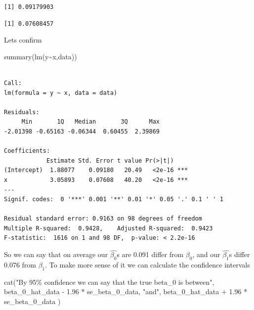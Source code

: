 \documentclass[
  letterpaper,
  DIV=11,
  numbers=noendperiod]{scrreprt}
\newenvironment{Shaded}{\begin{snugshade}}{\end{snugshade}}
\newcommand{\DecValTok}[1]{\textcolor[rgb]{0.47,0.16,0.63}{#1}}
\newcommand{\FloatTok}[1]{\textcolor[rgb]{0.65,0.35,0.00}{#1}}
\newcommand{\FunctionTok}[1]{\textcolor[rgb]{0.02,0.16,0.49}{#1}}
\newcommand{\NormalTok}[1]{\textcolor[rgb]{0.33,0.33,0.33}{#1}}
\newcommand{\OtherTok}[1]{\textcolor[rgb]{0.85,0.12,0.09}{#1}}
\newcommand{\SpecialCharTok}[1]{\textcolor[rgb]{0.00,0.46,0.62}{#1}}
\newcommand{\StringTok}[1]{\textcolor[rgb]{0.00,0.50,0.00}{#1}}
\begin{document}
\begin{verbatim}
[1] 0.09179903
\end{verbatim}

\begin{Shaded}
\end{Shaded}

\begin{verbatim}
[1] 0.07608457
\end{verbatim}

Lets confirm

\begin{Shaded}
\begin{Highlighting}[]
\FunctionTok{summary}\NormalTok{(}\FunctionTok{lm}\NormalTok{(y}\SpecialCharTok{\textasciitilde{}}\NormalTok{x,data))}
\end{Highlighting}
\end{Shaded}

\begin{verbatim}

Call:
lm(formula = y ~ x, data = data)

Residuals:
     Min       1Q   Median       3Q      Max 
-2.01398 -0.65163 -0.06344  0.60455  2.39869 

Coefficients:
            Estimate Std. Error t value Pr(>|t|)    
(Intercept)  1.88077    0.09180   20.49   <2e-16 ***
x            3.05893    0.07608   40.20   <2e-16 ***
---
Signif. codes:  0 '***' 0.001 '**' 0.01 '*' 0.05 '.' 0.1 ' ' 1

Residual standard error: 0.9163 on 98 degrees of freedom
Multiple R-squared:  0.9428,    Adjusted R-squared:  0.9423 
F-statistic:  1616 on 1 and 98 DF,  p-value: < 2.2e-16
\end{verbatim}

So we can say that on average our \(\hat{\beta_0}\)s are 0.091 differ
from \(\beta_0\), and our \(\hat{\beta_1}\)s differ 0.076 from
\(\beta_1\). To make more sense of it we can calculate the confidence
intervals

\begin{Shaded}
\begin{Highlighting}[]
\FunctionTok{cat}\NormalTok{(}\StringTok{"By 95\% confidence we can say that the true beta\_0 is between"}\NormalTok{, beta\_0\_hat\_data }\SpecialCharTok{{-}} \FloatTok{1.96} \SpecialCharTok{*}\NormalTok{ se\_beta\_0\_data, }\StringTok{"and"}\NormalTok{, beta\_0\_hat\_data }\SpecialCharTok{+} \FloatTok{1.96} \SpecialCharTok{*}\NormalTok{ se\_beta\_0\_data )}
\end{Highlighting}
\end{Shaded}
\end{document}
